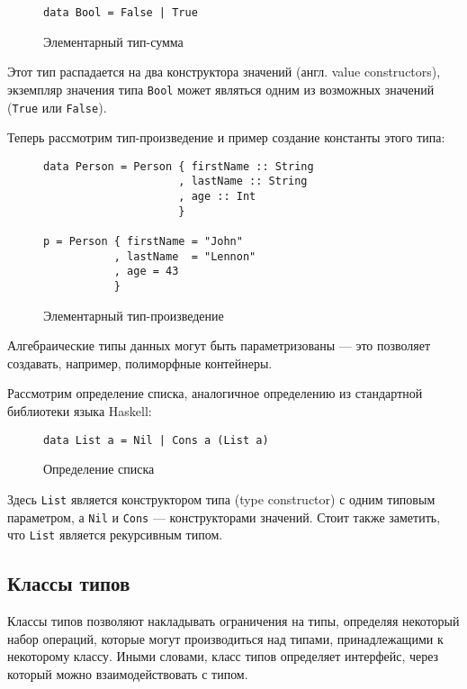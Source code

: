 \begin{figure}[h]
\begin{lstlisting}
data Bool = False | True
\end{lstlisting}
\caption{Элементарный тип-сумма}
\label{listing:Bool}
\end{figure}

Этот тип распадается на два конструктора значений (англ. value constructors), 
экземпляр значения типа \lstinline{Bool} может являться одним из возможных 
значений (\lstinline{True} или \lstinline{False}).

Теперь рассмотрим тип-произведение и пример создание константы этого типа:

\begin{figure}[h]
\begin{lstlisting}
data Person = Person { firstName :: String
                     , lastName :: String
                     , age :: Int
                     }

p = Person { firstName = "John"
           , lastName  = "Lennon"
           , age = 43
           }
\end{lstlisting}
\caption{Элементарный тип-произведение}
\label{listing:Bool}
\end{figure}

Алгебраические типы данных могут быть параметризованы --- это позволяет 
создавать, например, полиморфные контейнеры.

Рассмотрим определение списка, аналогичное определению из стандартной библиотеки 
языка Haskell:

\begin{figure}[h]
\begin{lstlisting}
data List a = Nil | Cons a (List a)
\end{lstlisting}
\caption{Определение списка}
\label{listing:List}
\end{figure}

Здесь \lstinline{List} является конструктором типа (type constructor) с одним 
типовым параметром, а \lstinline{Nil} и \lstinline{Cons} --- конструкторами 
значений. Стоит также заметить, что \lstinline{List} является рекурсивным типом.

\subsection{Классы типов}

Классы типов позволяют накладывать ограничения на типы, определяя некоторый 
набор операций, которые могут производиться над типами, принадлежащими к 
некоторому классу. Иными словами, класс типов определяет интерфейс, 
через который можно взаимодействовать с типом.

